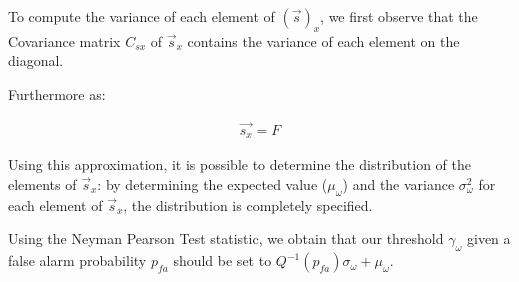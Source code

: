 \documentclass[a4paper, openany, oneside]{memoir}
\begin{document}
To compute the variance of each element of $(\vec{s})_x$, we first observe that the Covariance matrix $C_{sx}$ of $\vec{s}_x$ contains the variance of each element  on the diagonal.

Furthermore as:

\begin{align*}
\vec{s_x} = F
\end{align*}

Using this approximation, it is possible to determine the distribution of the elements  of $\vec{s}_x$: by determining the expected value ($\mu_{\omega}$) and the variance $\sigma_{\omega}^2$ for each element of $\vec{s}_x$, the distribution is completely specified.

Using the Neyman Pearson Test statistic, we obtain that our threshold $\gamma_{\omega}$ given a false alarm probability $p_{fa}$ should be set to $Q^{-1}(p_{fa})\sigma_{\omega} + \mu_{\omega}$.
\end{document}
